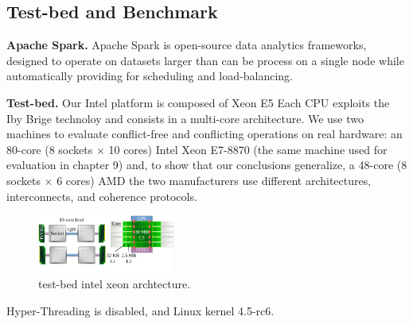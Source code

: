 \fi



\subsection{Test-bed and Benchmark}

\ifkor
\noindent
\textbf{Apache Spark. }
Apache Spark is open-source data analytics frameworks, designed to operate on
datasets larger than can be process on a single node while automatically
providing for scheduling and load-balancing.
\else

\fi

\ifkor
\noindent
\textbf{Test-bed. }
Our Intel platform is composed of Xeon E5 Each CPU exploits the Iby Brige
technoloy and consists in a multi-core architecture.
We use two machines to evaluate conflict-free and conflicting operations on real hardware: an
80-core (8 sockets × 10 cores) Intel Xeon E7-8870 (the same machine used for evaluation in
chapter 9) and, to show that our conclusions generalize, a 48-core (8 sockets × 6 cores) AMD
the two manufacturers use different architectures, interconnects, and coherence protocols.

\begin{figure}[h]
  \begin{center}
     \includegraphics[width=0.4\textwidth]{fig/xeon}
  \end{center}
  \caption{test-bed intel xeon archtecture.}
  \label{fig:basic}
\end{figure}
Hyper-Threading is disabled, and Linux kernel 4.5-rc6.
\else

\fi

